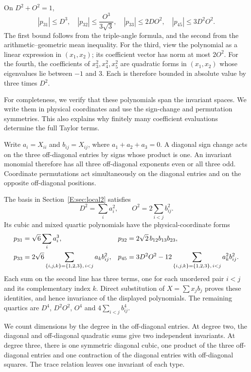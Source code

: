 \documentclass[reqno,english]{amsart}
\theoremstyle{definition}
\newtheorem{open problem}[theorem]{Open Problem}
\theoremstyle{remark}
\theoremstyle{plain}
\numberwithin{equation}{section}
\begin{document}
On $D^2+O^2=1$,
\begin{equation}
 |p_{31}|\le D^3,\quad
 |p_{32}|\le\frac{O^3}{3\sqrt3},\quad
 |p_{33}|\le2DO^2,\quad |p_{45}|\le3D^2O^2.
 \label{E:eq:invariant-bounds}
\end{equation}
The first bound follows from the triple-angle formula, and the second
from the arithmetic--geometric mean inequality. For the third, view
the polynomial as a linear expression in $(x_1,x_2)$; its coefficient
vector has norm at most $2O^2$. For the fourth, the coefficients of
$x_3^2,x_4^2,x_5^2$ are quadratic forms in $(x_1,x_2)$ whose
eigenvalues lie between $-1$ and $3$. Each is therefore bounded in
absolute value by three times $D^2$.


For completeness, we verify that these polynomials span the invariant
spaces. We write them in physical coordinates and use the sign-change
and permutation symmetries. This also explains why finitely many
coefficient evaluations determine the full Taylor terms.

Write $a_i=X_{ii}$ and $b_{ij}=X_{ij}$, where $a_1+a_2+a_3=0$.
A diagonal sign change acts on the three off-diagonal entries by signs
whose product is one. An invariant monomial therefore has all three
off-diagonal exponents even or all three odd. Coordinate permutations act
simultaneously on the diagonal entries and on the opposite off-diagonal
positions.

The basis in Section~\ref{E:sec:local2} satisfies
\[
 D^2=\sum_i a_i^2,\qquad O^2=2\sum_{i<j}b_{ij}^2.
\]
Its cubic and mixed quartic polynomials have the physical-coordinate forms
\begin{align}\label{eq:physical-invariants}
 p_{31}&=\sqrt6\sum_i a_i^3,
 &p_{32}&=2\sqrt2\,b_{12}b_{13}b_{23},\notag\\
 p_{33}&=2\sqrt6\sum_{\{i,j,k\}=\{1,2,3\},\,i<j}a_kb_{ij}^2,
 &p_{45}&=3D^2O^2-12\sum_{\{i,j,k\}=\{1,2,3\},\,i<j}a_k^2b_{ij}^2.
\end{align}
Each sum on the second line has three terms, one for each unordered pair
$i<j$ and its complementary index $k$. Direct substitution of $X=\sum x_jb_j$
proves these identities, and hence invariance of the displayed polynomials.
The remaining quartics are $D^4$, $D^2O^2$, $O^4$ and
$4\sum_{i<j}b_{ij}^4$.

We count dimensions by the degree in the off-diagonal entries.
At degree two, the diagonal and off-diagonal quadratic sums give
two independent invariants. At degree three, there is one symmetric
diagonal cubic, one product of the three off-diagonal entries and one
contraction of the diagonal entries with off-diagonal squares.
The trace relation leaves one invariant of each type.
\end{document}
